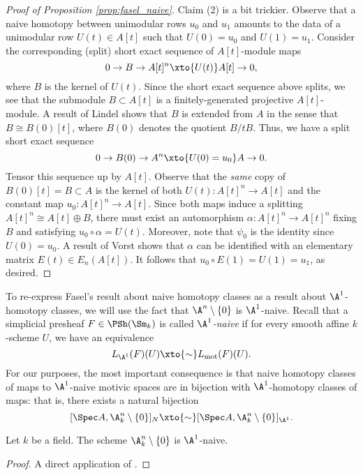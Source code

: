 \begin{proof}[Proof of Proposition \ref{prop:fasel_naive}]
    Claim (2) is a bit trickier. Observe that a naive homotopy between unimodular rows $u_0$ and $u_1$ amounts to the data of a unimodular row $U(t) \in A[t]$ such that $U(0) = u_0$ and $U(1) = u_1$. Consider the corresponding (split) short exact sequence of $A[t]$-module maps
    \[
    0 \to B \to A[t]^n \xto{U(t)} A[t] \to 0,
    \]
    where $B$ is the kernel of $U(t)$. Since the short exact sequence above splits, we see that the submodule $B \subset A[t]$ is a finitely-generated projective $A[t]$-module. A result of Lindel \cite[Lemma 3]{Lindel} shows that $B$ is extended from $A$ in the sense that $B \cong B(0)[t]$, where $B(0)$ denotes the quotient $B/tB$. Thus, we have a split short exact sequence
    \[
    0 \to B(0) \to A^n \xto{U(0) = u_0} A \to 0.
    \]
    Tensor this sequence up by $A[t]$. Observe that the \textit{same} copy of $B(0)[t] = B \subset A$ is the kernel of both $U(t): A[t]^n \to A[t]$ and the constant map $u_0: A[t]^n \to A[t]$. Since both maps induce a splitting $A[t]^n \cong A[t] \oplus B$, there must exist an automorphism $\alpha: A[t]^n \to A[t]^n$ fixing $B$ and satisfying $u_0 \circ \alpha = U(t)$. Moreover, note that $\psi_0$ is the identity since $U(0) = u_0$. A result of Vorst \cite{Vorst} shows that $\alpha$ can be identified with an elementary matrix $E(t) \in E_n(A[t])$. It follows that $u_0 \circ E(1) = U(1) = u_1$, as desired.
\end{proof}

To re-express Fasel's result about naive homotopy classes as a result about $\A^1$-homotopy classes, we will use the fact that $\A^n \setminus \{0\}$ is $\A^1$-naive. Recall that a simplicial presheaf $F \in \PSh(\Sm_k)$ is called \textit{$\A^1$-naive} if for every smooth affine $k$-scheme $U$, we have an equivalence
\[
L_{\A^1}(F)(U) \xto{\sim} L_{\operatorname{mot}}(F)(U).
\]
For our purposes, the most important consequence is that naive homotopy classes of maps to $\A^1$-naive motivic spaces are in bijection with $\A^1$-homotopy classes of maps: that is, there exists a natural bijection
\[
[\Spec A, \A^n_k\setminus \{0\}]_{N} \xto{\sim} [\Spec A, \A^n_k\setminus \{0\}]_{\A^1}.
\]

\begin{lemma}
    Let $k$ be a field. The scheme $\A^n_k \setminus \{0\}$ is $\A^1$-naive.
\end{lemma}

\begin{proof}
    A direct application of \cite[Corollary 4.2.6]{AHW2}.
\end{proof}

